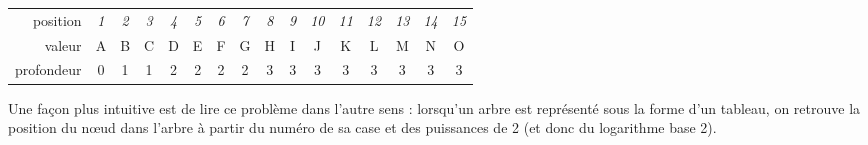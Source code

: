 \documentclass[11pt,a4paper]{article}
\begin{document}
\begin{table}[ht!]
\begin{minipage}{0.65\textwidth}
  \end{minipage}
  \hfillx
  \begin{minipage}{0.10\textwidth}


  \end{minipage}
  \hfillx
  \begin{minipage}{0.0\textwidth}
  \end{minipage}
\end{table}

\begin{center}
\begin{tabular}{ r c cc cccc cccccccc }
position   & \textit{1} & \textit{2} & \textit{3} & \textit{4} & \textit{5} & \textit{6} & \textit{7} &
             \textit{8} & \textit{9} & \textit{10} & \textit{11} & \textit{12} & \textit{13} &
			 \textit{14} & \textit{15} \\
\cline{2-16}
valeur     & \multicolumn{1}{|c|}{A} &
\multicolumn{1}{c|}{B} & \multicolumn{1}{c|}{C} &
\multicolumn{1}{c|}{D} & \multicolumn{1}{c|}{E} &
  \multicolumn{1}{c|}{F} & \multicolumn{1}{c|}{G} &
\multicolumn{1}{c|}{H} & \multicolumn{1}{c|}{I} & \multicolumn{1}{c|}{J} & \multicolumn{1}{c|}{K} &
  \multicolumn{1}{c|}{L} & \multicolumn{1}{c|}{M} & \multicolumn{1}{c|}{N} & \multicolumn{1}{c|}{O} \\
\cline{2-16}
profondeur & 0 &
             1 & 1 &
             2 & 2 & 2 & 2 &
             3 & 3 & 3 & 3 & 3 & 3 & 3 & 3 \\
\end{tabular}
\end{center}

\smallskip

Une façon plus intuitive est de lire ce problème dans l'autre sens : lorsqu'un arbre est représenté sous la forme d'un tableau, on retrouve la position du nœud dans l'arbre à partir du numéro de sa case et des puissances de 2 (et donc du logarithme base 2).
\end{document}
